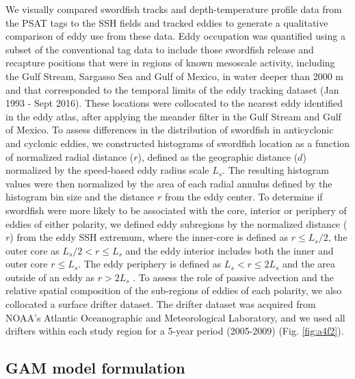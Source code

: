 We visually compared swordfish tracks and depth-temperature profile data from the PSAT tags to the SSH fields and tracked eddies to generate a qualitative comparison of eddy use from these data. Eddy occupation was quantified using a subset of the conventional tag data to include those swordfish release and recapture positions that were in regions of known mesoscale activity, including the Gulf Stream, Sargasso Sea and Gulf of Mexico, in water deeper than 2000 m and that corresponded to the temporal limits of the eddy tracking dataset (Jan 1993 - Sept 2016). These locations were collocated to the nearest eddy identified in the eddy atlas, after applying the meander filter in the Gulf Stream and Gulf of Mexico. To assess differences in the distribution of swordfish in anticyclonic and cyclonic eddies, we constructed histograms of swordfish location as a function of normalized radial distance ($r$), defined as the geographic distance ($d$) normalized by the speed-based eddy radius scale $L_s$.  The resulting histogram values were then normalized by the area of each radial annulus defined by the histogram bin size and the distance $r$ from the eddy center. To determine if swordfish were more likely to be associated with the core, interior or periphery of eddies of either polarity, we defined eddy subregions by the normalized distance ($r$) from the eddy SSH extremum, where the inner-core is defined as $r \leq L_s/2$, the outer core as $L_s/2 < r \leq L_s$ and the eddy interior includes both the inner and outer core $r \leq L_s$. The eddy periphery is defined as $L_s < r \leq 2L_s$ and the area outside of an eddy as $r > 2L_s$ \citep[see Fig. 2 in][]{Gaube2017}. To assess the role of passive advection and the relative spatial composition of the sub-regions of eddies of each polarity, we also collocated a surface drifter dataset. The drifter dataset was acquired from NOAA's Atlantic Oceanographic and Meteorological Laboratory, and we used all drifters within each study region for a 5-year period (2005-2009) (Fig. \ref{fig:a4f2}).

\subsection{GAM model formulation}

